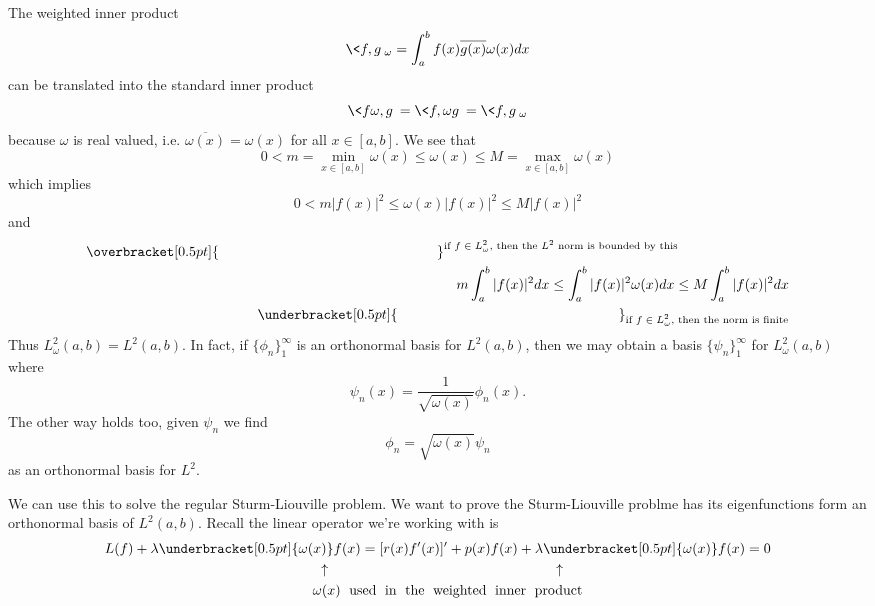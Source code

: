 \begin{rmk}
The weighted inner product
\begin{equation}
\<f,g\>_{\omega} = \int^{b}_{a}f(x)\overline{g(x)}\omega(x)dx
\end{equation}
can be translated into the standard inner product
\begin{equation}
\<f\omega,g\>=\<f,\omega g\>=\<f,g\>_{\omega}
\end{equation}
because $\omega$ is real valued,
i.e. $\overline{\omega(x)}=\omega(x)$ for all
$x\in[a,b]$. We see that
\begin{equation}
0<m=\min_{x\in[a,b]}\omega(x)\leq\omega(x)\leq M=\max_{x\in[a,b]}\omega(x)
\end{equation}
which implies
\begin{equation}
0<m|f(x)|^2\leq\omega(x)|f(x)|^{2}\leq M|f(x)|^2
\end{equation}
and
\begin{align}
\overbracket[0.5pt]{\hphantom{m\int^{b}_{a}|f(x)|^{2}dx\leq\int^{b}_{a}|f(x)|^{2}\omega(x)dx}}^{\text{if $f\in L^{2}_{\omega}$, then the $L^2$ norm is bounded by this}} \hphantom{\leq M\int^{b}_{a}|f(x)|^{2}dx}\nonumber\\
m\int^{b}_{a}|f(x)|^{2}dx\leq\int^{b}_{a}|f(x)|^{2}\omega(x)dx\leq M\int^{b}_{a}|f(x)|^{2}dx\\
\hphantom{m\int^{b}_{a}|f(x)|^{2}dx}\underbracket[0.5pt]{\hphantom{\int^{b}_{a}|f(x)|^{2}\omega(x)dx\leq M\int^{b}_{a}|f(x)|^{2}dx}}_{\text{if $f\in L^{2}_{\omega}$, then the norm is finite}}\nonumber
\end{align}
Thus $L^{2}_{\omega}(a,b) = L^{2}(a,b)$. In fact, if
$\{\phi_{n}\}^{\infty}_{1}$ is an orthonormal basis for
$L^{2}(a,b)$, then we may obtain a basis
$\{\psi_{n}\}^{\infty}_{1}$ for $L^{2}_{\omega}(a,b)$ where 
\begin{equation}
\psi_{n}(x) = \frac{1}{\sqrt{\omega(x)}}\phi_{n}(x).
\end{equation}
The other way holds too, given $\psi_{n}$ we find
\begin{equation}
\phi_{n} = \sqrt{\omega(x)}\psi_{n}
\end{equation}
as an orthonormal basis for $L^{2}$.
\end{rmk}
We can use this to solve the regular Sturm-Liouville
problem. We want to prove the Sturm-Liouville problme has
its eigenfunctions form an orthonormal basis of
$L^{2}(a,b)$. Recall the linear operator we're working with is
\begin{align}
L(f)+\lambda\underbracket[0.5pt]{\omega(x)}&f(x)=[r(x)f'(x)]'+p(x)f(x)+\lambda\underbracket[0.5pt]{\omega(x)}f(x)=0\\
 &\!\!\!\!\!\!\!\uparrow \qquad\qquad\qquad\qquad\qquad\qquad\qquad\qquad\quad \!\!\!\!\uparrow \nonumber\\
 &\!\!\!\!\!\!\!\!\! \text{$\omega(x)$\;  used\;  in\;  the\;  weighted\;  inner\;  product} \nonumber
\end{align}
